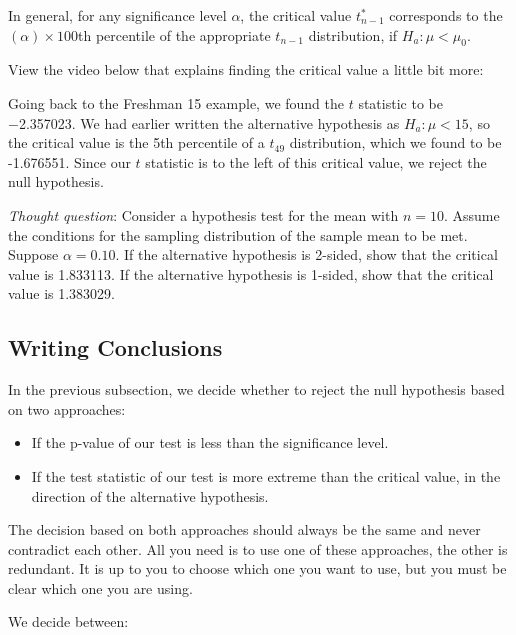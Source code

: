 \documentclass[
]{book}
\providecommand{\tightlist}{%
  \setlength{\itemsep}{0pt}\setlength{\parskip}{0pt}}
\begin{document}
In general, for any significance level \(\alpha\), the critical value \(t_{n-1}^*\) corresponds to the \((\alpha) \times 100\)th percentile of the appropriate \(t_{n-1}\) distribution, if \(H_a: \mu < \mu_0\).

View the video below that explains finding the critical value a little bit more:

Going back to the Freshman 15 example, we found the \(t\) statistic to be −2.357023. We had earlier written the alternative hypothesis as \(H_a: \mu < 15\), so the critical value is the 5th percentile of a \(t_{49}\) distribution, which we found to be -1.676551. Since our \(t\) statistic is to the left of this critical value, we reject the null hypothesis.

\emph{Thought question}: Consider a hypothesis test for the mean with \(n=10\). Assume the conditions for the sampling distribution of the sample mean to be met. Suppose \(\alpha=0.10\). If the alternative hypothesis is 2-sided, show that the critical value is 1.833113. If the alternative hypothesis is 1-sided, show that the critical value is 1.383029.

\hypertarget{writing-conclusions}{%
\subsection{Writing Conclusions}\label{writing-conclusions}}

In the previous subsection, we decide whether to reject the null hypothesis based on two approaches:

\begin{itemize}
\tightlist
\item
  If the p-value of our test is less than the significance level.
\item
  If the test statistic of our test is more extreme than the critical value, in the direction of the alternative hypothesis.
\end{itemize}

The decision based on both approaches should always be the same and never contradict each other. All you need is to use one of these approaches, the other is redundant. It is up to you to choose which one you want to use, but you must be clear which one you are using.

We decide between:
\end{document}
